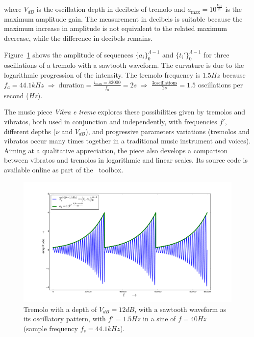 \noindent where $V_{dB}$ is the oscillation depth in decibels of tremolo and $a_{\text{max}}=10^{\frac{V_{dB}}{20}}$ is the maximum amplitude gain. The measurement in decibels is suitable because the maximum increase in amplitude is not equivalent to the related maximum decrease, while the difference in decibels remains.

Figure~\ref{fig:tremolo} shows the amplitude of sequences $\{a_i\}_0^{\Lambda-1}$ and $\{t_i'\}_0^{\Lambda-1}$ for three oscillations of a tremolo with a sawtooth waveform. The curvature is due to the logarithmic progression of the intensity. The tremolo frequency is $1.5Hz$ because $f_a=44.1kHz \; \Rightarrow \; \text{duration} = \frac{i_{\text{max}}=82000}{f_a}= 2s \; \Rightarrow \; \frac{3\text{oscillations}}{2s}=1.5$ oscillations per second ($Hz$). 

The music piece \emph{Vibra e treme} explores these possibilities given by tremolos and vibratos, both used in conjunction and independently, with frequencies $f'$, different depths ($\nu$ and $V_{dB}$), and progressive parameters variations (tremolos and vibratos occur many times together in a traditional music instrument and voices). Aiming at a qualitative appreciation, the piece also develops a comparison between vibratos and tremolos in logarithmic and linear scales. Its source code is available online as part of the \massa\ toolbox.

\begin{figure}
     \centering
         \includegraphics[width=\textwidth]{figures/tremolo}
     \caption{Tremolo with a depth of $V_{dB}=12dB$, with a sawtooth waveform as its oscillatory pattern, with $f'=1.5Hz$ in a sine of $f=40Hz$ (sample frequency $f_s=44.1kHz$).}
         \label{fig:tremolo}
\end{figure}

